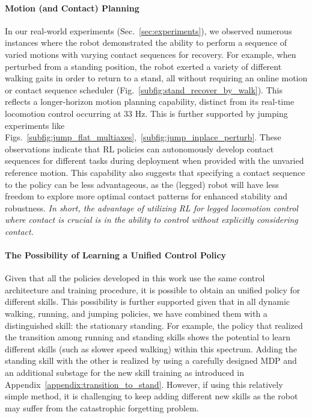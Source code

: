 \paragraph{Motion (and Contact) Planning}
In our real-world experiments (Sec.~\ref{sec:experiments}), we observed numerous instances where the robot demonstrated the ability to perform a sequence of varied motions with varying contact sequences for recovery. 
For example, when perturbed from a standing position, the robot exerted a variety of different walking gaits in order to return to a stand, all without requiring an online motion or contact sequence scheduler (Fig.~\ref{subfig:stand_recover_by_walk}). 
This reflects a longer-horizon motion planning capability, distinct from its real-time locomotion control occurring at 33 Hz.
This is further supported by jumping experiments like Figs.~\ref{subfig:jump_flat_multiaxes},~\ref{subfig:jump_inplace_perturb}. 
These observations indicate that RL policies can autonomously develop contact sequences for different tasks during deployment when provided with the unvaried reference motion.
This capability also suggests that specifying a contact sequence to the policy can be less advantageous, as the (legged) robot will have less freedom to explore more optimal contact patterns for enhanced stability and robustness.
\emph{In short, the advantage of utilizing RL for legged locomotion control where contact is crucial is in the ability to control without explicitly considering contact.} 





\paragraph{The Possibility of Learning a Unified Control Policy} 
Given that all the policies developed in this work use the same control architecture and training procedure, it is possible to obtain an unified policy for different skills.
This possibility is further supported given that in all dynamic walking, running, and jumping policies, we have combined them with a distinguished skill: the stationary standing. 
For example, the policy that realized the transition among running and standing skills shows the potential to learn different skills (such as slower speed walking) within this spectrum.   
Adding the standing skill with the other is realized by using a carefully designed MDP and an additional substage for the new skill training as introduced in Appendix~\ref{appendix:transition_to_stand}. 
However, if using this relatively simple method, it is challenging to keep adding different new skills as the robot may suffer from the catastrophic forgetting problem. 

